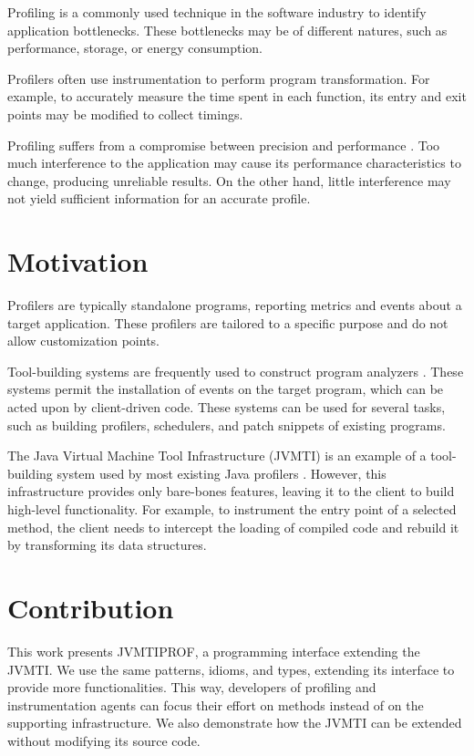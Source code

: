 \label{cap:introduction}

Profiling is a commonly used technique in the software industry to identify application bottlenecks. These bottlenecks may be of different natures, such as performance, storage, or energy consumption.

Profilers often use instrumentation to perform program transformation. For example, to accurately measure the time spent in each function, its entry and exit points may be modified to collect timings.

Profiling suffers from a compromise between precision and performance \cite{ponder1988inaccuracies}. Too much interference to the application may cause its performance characteristics to change, producing unreliable results. On the other hand, little interference may not yield sufficient information for an accurate profile.

\section{Motivation}

Profilers are typically standalone programs, reporting metrics and events about a target application. These profilers are tailored to a specific purpose and do not allow customization points.

Tool-building systems are frequently used to construct program analyzers \cite{srivastava1994atom,nethercote2007valgrind}. These systems permit the installation of events on the target program, which can be acted upon by client-driven code. These systems can be used for several tasks, such as building profilers, schedulers, and patch snippets of existing programs.

The Java Virtual Machine Tool Infrastructure (JVMTI) is an example of a tool-building system used by most existing Java profilers \cite{mytkowicz2010evaluating}. However, this infrastructure provides only bare-bones features, leaving it to the client to build high-level functionality. For example, to instrument the entry point of a selected method, the client needs to intercept the loading of compiled code and rebuild it by transforming its data structures.

\section{Contribution}

This work presents JVMTIPROF, a programming interface extending the JVMTI. We use the same patterns, idioms, and types, extending its interface to provide more functionalities. This way, developers of profiling and instrumentation agents can focus their effort on methods instead of on the supporting infrastructure. We also demonstrate how the JVMTI can be extended without modifying its source code.

